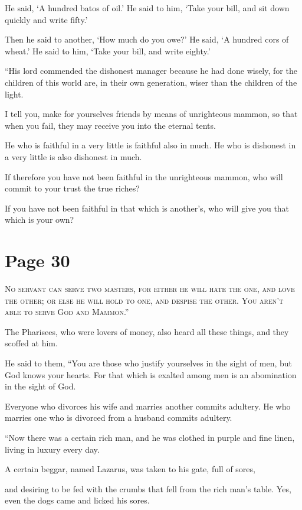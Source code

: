 He said, ‘A hundred batos of oil.’ He said to him, ‘Take your bill, and sit down quickly and write fifty.’

Then he said to another, ‘How much do you owe?’ He said, ‘A hundred cors of wheat.’ He said to him, ‘Take your bill, and write eighty.’

“His lord commended the dishonest manager because he had done wisely, for the children of this world are, in their own generation, wiser than the children of the light.

I tell you, make for yourselves friends by means of unrighteous mammon, so that when you fail, they may receive you into the eternal tents.

He who is faithful in a very little is faithful also in much. He who is dishonest in a very little is also dishonest in much.

If therefore you have not been faithful in the unrighteous mammon, who will commit to your trust the true riches?

If you have not been faithful in that which is another’s, who will give you that which is your own?



\chapterornament
\section*{Page 30}

\lettrine{N}{o servant can serve two masters, for either he will hate the one, and love the other; or else he will hold to one, and despise the other. You aren’t able to serve God and Mammon.”}

The Pharisees, who were lovers of money, also heard all these things, and they scoffed at him.

He said to them, “You are those who justify yourselves in the sight of men, but God knows your hearts. For that which is exalted among men is an abomination in the sight of God.

Everyone who divorces his wife and marries another commits adultery. He who marries one who is divorced from a husband commits adultery.

“Now there was a certain rich man, and he was clothed in purple and fine linen, living in luxury every day.

A certain beggar, named Lazarus, was taken to his gate, full of sores,

and desiring to be fed with the crumbs that fell from the rich man’s table. Yes, even the dogs came and licked his sores.

